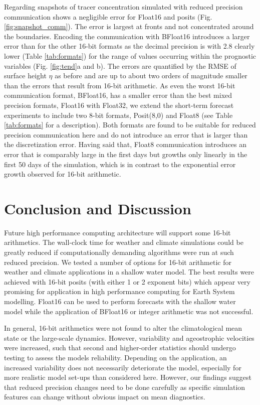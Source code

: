 \documentclass[draft]{agujournal2019}
\begin{document}
Regarding snapshots of tracer concentration simulated with reduced precision
communication shows a negligible error for Float16 and posits (Fig. \ref{fig:snapshot_comm}).
The error is largest at fronts and not concentrated around the boundaries.
Encoding the communication with BFloat16 introduces a larger error than for the
other 16-bit formats as the decimal precision is with 2.8 clearly lower
(Table \ref{tab:formats}) for the range of values occurring within the prognostic
variables (Fig. \ref{fig:tend}a and b). The errors are quantified by the RMSE of
surface height $\eta$ as before and are up to about two orders of magnitude smaller
than the errors that result from 16-bit arithmetic. As even the worst 16-bit
communication format, BFloat16, has a smaller error than the best mixed precision
formats, Float16 with Float32, we extend the short-term forecast experiments to
include two 8-bit formats, Posit(8,0) and Float8 (see Table \ref{tab:formats} for
a description). Both formats are found to be suitable for reduced precision
communication here and do not introduce an error that is larger than the
discretization error. Having said that, Float8 communication introduces an error
that is comparably large in the first days but growths only linearly in the first
50 days of the simulation, which is in contrast to the exponential error growth
observed for 16-bit arithmetic.

\section{Conclusion and Discussion}
\label{sec:discuss}

Future high performance computing architecture will support some 16-bit
arithmetics. The wall-clock time for weather and climate simulations could
be greatly reduced if computationally demanding algorithms were run at such
reduced precision. We tested a number of options for 16-bit arithmetic for
weather and climate applications in a shallow water model. The best results
were achieved with 16-bit posits (with either 1 or 2 exponent bits) which appear
very promising for application in high performance computing for Earth System
modelling. Float16 can be used to perform forecasts with the shallow water model
while the application of BFloat16 or integer arithmetic was not successful.

In general, 16-bit arithmetics were not found to alter the climatological mean
state or the large-scale dynamics. However, variability and ageostrophic velocities
were increased, such that second and higher-order statistics should undergo
testing to assess the models reliability. Depending on the application, an increased
variability does not necessarily deteriorate the model, especially for more
realistic model set-ups than considered here. However, our findings suggest that
reduced precision changes need to be done carefully as specific simulation features
can change without obvious impact on mean diagnostics.
\end{document}

